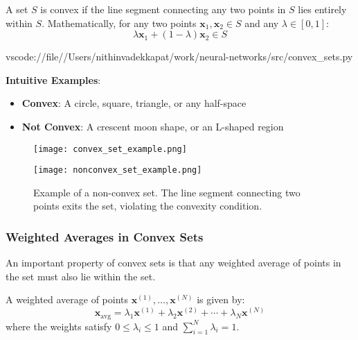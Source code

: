 \begin{definition}
A set \(S\) is convex if the line segment connecting any two points in \(S\) lies entirely within \(S\). Mathematically, for any two points \(\mathbf{x}_1, \mathbf{x}_2 \in S\) and any \(\lambda \in [0,1]\):
\[
\lambda \mathbf{x}_1 + (1-\lambda) \mathbf{x}_2 \in S
\]
\end{definition}

\begin{codelink}{vscode://file//Users/nithinvadekkapat/work/neural-networks/src/convex_sets.py}
\end{codelink}

\textbf{Intuitive Examples}:
\begin{itemize}
    \item \textbf{Convex}: A circle, square, triangle, or any half-space
    \item \textbf{Not Convex}: A crescent moon shape, or an L-shaped region
\end{itemize}

\begin{figure}[H]
    \centering
    \begin{minipage}{0.48\textwidth}
        \centering
        \texttt{[image: convex\_set\_example.png]}
        \caption{Example of a convex set. Any line segment connecting two points in the set lies entirely within the set.}
        \label{fig:convex_set_example}
    \end{minipage}%
    \hfill
    \begin{minipage}{0.48\textwidth}
        \centering
        \texttt{[image: nonconvex\_set\_example.png]}
        \caption{Example of a non-convex set. The line segment connecting two points exits the set, violating the convexity condition.}
        \label{fig:nonconvex_set_example}
    \end{minipage}
\end{figure}

\subsubsection{Weighted Averages in Convex Sets}

An important property of convex sets is that any weighted average of points in the set must also lie within the set.

\begin{definition}
A weighted average of points \(\mathbf{x}^{(1)}, \ldots, \mathbf{x}^{(N)}\) is given by:
\[
\mathbf{x}_{\text{avg}} = \lambda_1 \mathbf{x}^{(1)} + \lambda_2 \mathbf{x}^{(2)} + \cdots + \lambda_N \mathbf{x}^{(N)}
\]
where the weights satisfy \(0 \leq \lambda_i \leq 1\) and \(\sum_{i=1}^{N} \lambda_i = 1\).
\end{definition}

